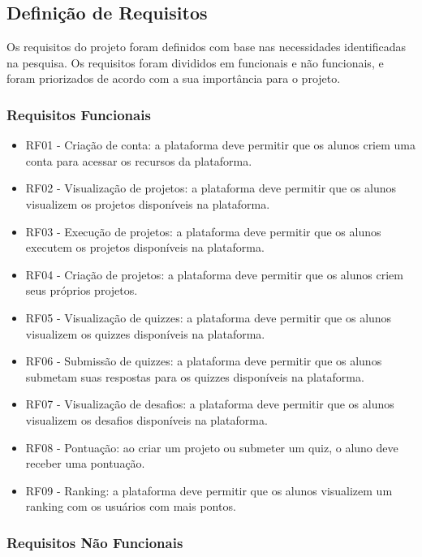 \subsection{Definição de Requisitos}

Os requisitos do projeto foram definidos com base nas necessidades identificadas na pesquisa. Os requisitos foram divididos em funcionais e não funcionais, e foram priorizados de acordo com a sua importância para o projeto.

\subsubsection{Requisitos Funcionais}

\begin{itemize}
    \item RF01 - Criação de conta: a plataforma deve permitir que os alunos criem uma conta para acessar os recursos da plataforma.
    \item RF02 - Visualização de projetos: a plataforma deve permitir que os alunos visualizem os projetos disponíveis na plataforma.
    \item RF03 - Execução de projetos: a plataforma deve permitir que os alunos executem os projetos disponíveis na plataforma.
    \item RF04 - Criação de projetos: a plataforma deve permitir que os alunos criem seus próprios projetos.
    \item RF05 - Visualização de quizzes: a plataforma deve permitir que os alunos visualizem os quizzes disponíveis na plataforma.
    \item RF06 - Submissão de quizzes: a plataforma deve permitir que os alunos submetam suas respostas para os quizzes disponíveis na plataforma.
    \item RF07 - Visualização de desafios: a plataforma deve permitir que os alunos visualizem os desafios disponíveis na plataforma.
    \item RF08 - Pontuação: ao criar um projeto ou submeter um quiz, o aluno deve receber uma pontuação.
    \item RF09 - Ranking: a plataforma deve permitir que os alunos visualizem um ranking com os usuários com mais pontos.
\end{itemize}

\subsubsection{Requisitos Não Funcionais}

